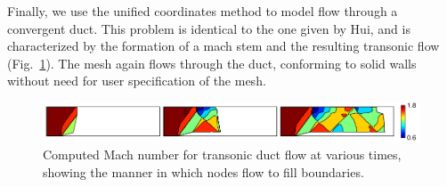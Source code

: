 \documentclass[12pt,letterpaper]{article}
\begin{document}
Finally, we use the unified coordinates method to model flow through a
convergent duct. This problem is identical to the one given by
Hui\cite{hui99}, and is characterized by the formation of a mach stem
and the resulting transonic flow
(Fig.~\ref{fig:shock_train_channel_flow}). The mesh again flows
through the duct, conforming to solid walls without need for user
specification of the mesh. 

\begin{figure}[htbp] %
   \centering
   \includegraphics[width=6in]{Channel_flow_filmstrip_image_mach.pdf} 
   \caption[Time-Lapse Images of Transonic Duct Flow]{Computed Mach
     number for transonic duct flow at various times, showing the
     manner in which nodes flow to fill boundaries.}
   \label{fig:shock_train_channel_flow}
\end{figure}
\end{document}
